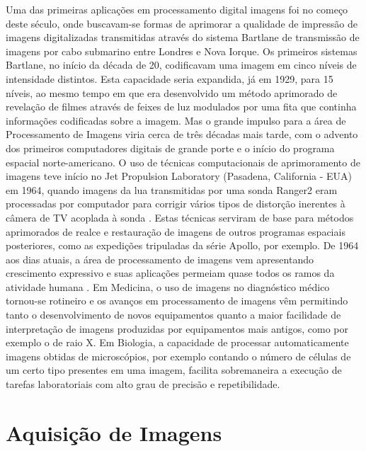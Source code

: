 \documentclass[openright]{UFRGS} %
\begin{document}
Uma das primeiras aplicações em processamento digital imagens foi no começo deste século,
onde buscavam-se formas de aprimorar a qualidade de impressão de imagens digitalizadas
transmitidas através do sistema Bartlane de transmissão de imagens por cabo submarino entre
Londres e Nova Iorque. Os primeiros sistemas Bartlane, no início da década de 20, codificavam
uma imagem em cinco níveis de intensidade distintos. Esta capacidade seria expandida, já em
1929, para 15 níveis, ao mesmo tempo em que era desenvolvido um método aprimorado de
revelação de filmes através de feixes de luz modulados por uma fita que continha informações
codificadas sobre a imagem. Mas o grande impulso para a área de Processamento de Imagens viria cerca de três
décadas mais tarde, com o advento dos primeiros computadores digitais de grande porte e o
início do programa espacial norte-americano. O uso de técnicas computacionais de
aprimoramento de imagens teve início no Jet Propulsion Laboratory (Pasadena, California -
EUA) em 1964, quando imagens da lua transmitidas por uma sonda Ranger2
eram processadas por computador para corrigir vários tipos de distorção inerentes à câmera de TV acoplada à
sonda \cite{gonzalez2010processamento}. Estas técnicas serviram de base para métodos aprimorados de realce e restauração de
imagens de outros programas espaciais posteriores, como as expedições tripuladas da série
Apollo, por exemplo. De 1964 aos dias atuais, a área de processamento de imagens vem apresentando
crescimento expressivo e suas aplicações permeiam quase todos os ramos da atividade humana \cite{de2000processamento}.
Em Medicina, o uso de imagens no diagnóstico médico tornou-se rotineiro e os avanços em
processamento de imagens vêm permitindo tanto o desenvolvimento de novos equipamentos
quanto a maior facilidade de interpretação de imagens produzidas por equipamentos mais
antigos, como por exemplo o de raio X. Em Biologia, a capacidade de processar
automaticamente imagens obtidas de microscópios, por exemplo contando o número de células
de um certo tipo presentes em uma imagem, facilita sobremaneira a execução de tarefas
laboratoriais com alto grau de precisão e repetibilidade. 



\section{Aquisição de Imagens}
\end{document}
